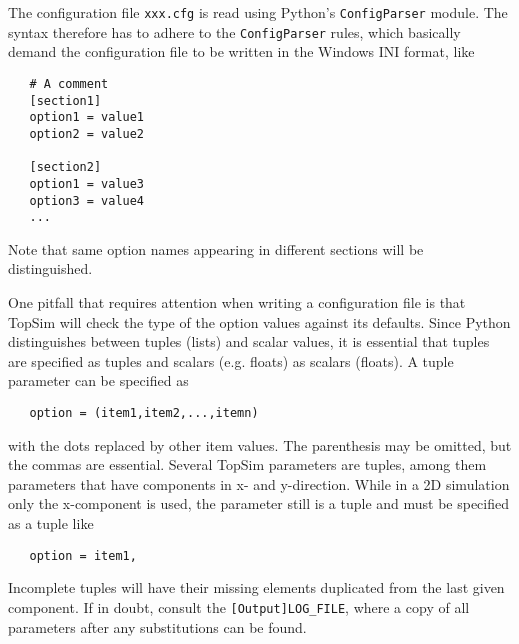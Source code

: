 The configuration file \texttt{xxx.cfg} is read using Python's 
\texttt{ConfigParser} module. The syntax therefore has to adhere to the 
\texttt{ConfigParser} rules, which basically demand the configuration file
to be written in the Windows INI format, like
%
\begin{verbatim}
   # A comment
   [section1]
   option1 = value1
   option2 = value2

   [section2]
   option1 = value3
   option3 = value4
   ...
   \end{verbatim}
%
Note that same option names appearing in different sections will be
distinguished.

One pitfall that requires attention when writing a configuration file is that
TopSim will check the type of the option values against its defaults. Since
Python distinguishes between tuples (lists) and scalar values, it is essential
that tuples are specified as tuples and scalars (e.g. floats) as scalars
(floats). A tuple parameter can be specified as
%
\begin{verbatim}
   option = (item1,item2,...,itemn)
\end{verbatim}
%
with the dots replaced by other item values. The parenthesis may be
omitted, but the commas are essential. Several TopSim parameters are tuples,
among them parameters that have components in x- and y-direction. While in a 2D
simulation only the x-component is used, the parameter still is a tuple and must
be specified as a tuple like
%
\begin{verbatim}
   option = item1,
\end{verbatim}
%
Incomplete tuples will have their missing elements duplicated from the last
given component. If in doubt, consult the \texttt{[Output]LOG\_FILE}, where a
copy of all parameters after any substitutions can be found.
